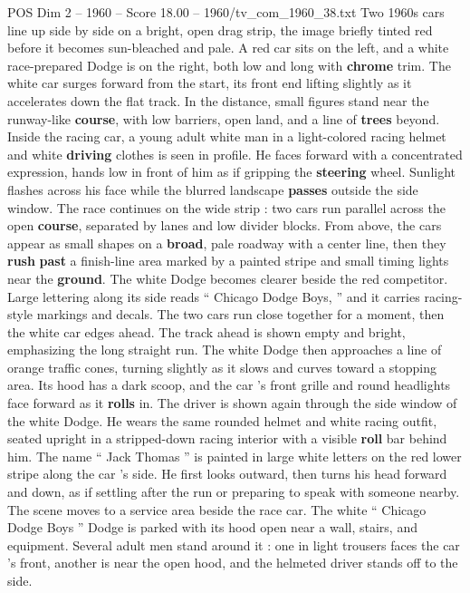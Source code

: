 \begin{textsample}{POS Dim 2 – 1960 – Score 18.00 – 1960/tv\_com\_1960\_38.txt}  \label{ex:f2_pos_012}
Two 1960s cars line up side by side on a bright, open drag strip, the image briefly tinted red before it becomes sun-bleached and pale.
A red car sits on the left, and a white race-prepared Dodge is on the right, both low and long with \textbf{chrome} trim.
The white car surges forward from the start, its front end lifting slightly as it accelerates down the flat track.
In the distance, small figures stand near the runway-like \textbf{course}, with low barriers, open land, and a line of \textbf{trees} beyond.
Inside the racing car, a young adult white man in a light-colored racing helmet and white \textbf{driving} clothes is seen in profile.
He faces forward with a concentrated expression, hands low in front of him as if gripping the \textbf{steering} wheel.
Sunlight flashes across his face while the blurred landscape \textbf{passes} outside the side window.
The race continues on the wide strip : two cars run parallel across the open \textbf{course}, separated by lanes and low divider blocks.
From above, the cars appear as small shapes on a \textbf{broad}, pale roadway with a center line, then they \textbf{rush} \textbf{past} a finish-line area marked by a painted stripe and small timing lights near the \textbf{ground}.
The white Dodge becomes clearer beside the red competitor.
Large lettering along its side reads “ Chicago Dodge Boys, ” and it carries racing-style markings and decals.
The two cars run close together for a moment, then the white car edges ahead.
The track ahead is shown empty and bright, emphasizing the long straight run.
The white Dodge then approaches a line of orange traffic cones, turning slightly as it slows and curves toward a stopping area.
Its hood has a dark scoop, and the car ’s front grille and round headlights face forward as it \textbf{rolls} in.
The driver is shown again through the side window of the white Dodge.
He wears the same rounded helmet and white racing outfit, seated upright in a stripped-down racing interior with a visible \textbf{roll} bar behind him.
The name “ Jack Thomas ” is painted in large white letters on the red lower stripe along the car ’s side.
He first looks outward, then turns his head forward and down, as if settling after the run or preparing to speak with someone nearby.
The scene moves to a service area beside the race car.
The white “ Chicago Dodge Boys ” Dodge is parked with its hood open near a wall, stairs, and equipment.
Several adult men stand around it : one in light trousers faces the car ’s front, another is near the open hood, and the helmeted driver stands off to the side.

\end{textsample}
